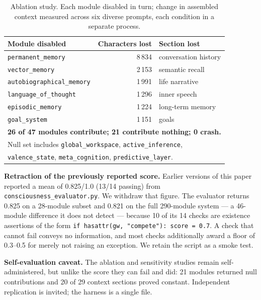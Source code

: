 \documentclass[11pt,a4paper]{article}
\begin{document}
\begin{table}[h]
\centering
\small
\begin{tabular}{lrl}
\toprule
\textbf{Module disabled} & \textbf{Characters lost} & \textbf{Section lost} \\
\midrule
\texttt{permanent\_memory}        & 8\,834 & conversation history \\
\texttt{vector\_memory}           & 2\,153 & semantic recall \\
\texttt{autobiographical\_memory} & 1\,991 & life narrative \\
\texttt{language\_of\_thought}    & 1\,296 & inner speech \\
\texttt{episodic\_memory}         & 1\,224 & long-term memory \\
\texttt{goal\_system}             & 1\,151 & goals \\
\midrule
\multicolumn{3}{l}{\textbf{26 of 47 modules contribute; 21 contribute nothing; 0 crash.}} \\
\multicolumn{3}{l}{Null set includes \texttt{global\_workspace}, \texttt{active\_inference},} \\
\multicolumn{3}{l}{\texttt{valence\_state}, \texttt{meta\_cognition}, \texttt{predictive\_layer}.} \\
\bottomrule
\end{tabular}
\caption{Ablation study. Each module disabled in turn; change in assembled context
measured across six diverse prompts, each condition in a separate process.}
\label{tab:ablation}
\end{table}

\textbf{Retraction of the previously reported score.} Earlier versions of this paper reported
a mean of 0.825/1.0 (13/14 passing) from \texttt{consciousness\_evaluator.py}. We withdraw
that figure. The evaluator returns 0.825 on a 28-module subset and 0.821 on the full
290-module system --- a 46-module difference it does not detect --- because 10 of its 14
checks are existence assertions of the form
\texttt{if hasattr(gw,\,"compete"): score = 0.7}. A check that cannot fail conveys no
information, and most checks additionally award a floor of 0.3--0.5 for merely not raising an
exception. We retain the script as a smoke test.

\textbf{Self-evaluation caveat.} The ablation and sensitivity studies remain self-administered,
but unlike the score they can fail and did: 21 modules returned null contributions and 20 of
29 context sections proved constant. Independent replication is invited; the harness is a
single file.
\end{document}
